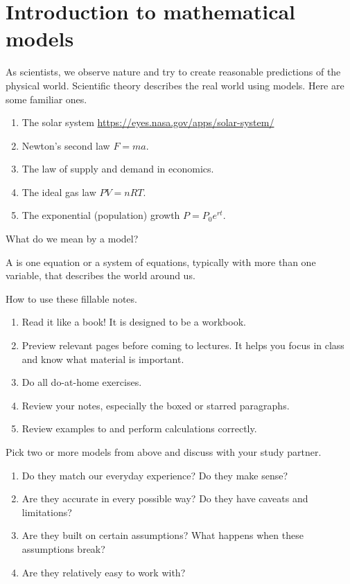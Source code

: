 \documentclass[../main.tex]{subfiles}
\begin{document}
 \section{Introduction to mathematical models}
As scientists, we observe nature and try to create reasonable predictions of the physical world. Scientific theory describes the real world using models. Here are some familiar ones.

\begin{enumerate}
  \item The solar system \url{https://eyes.nasa.gov/apps/solar-system/}
  \item Newton's second law \(F = ma\).
  \item The law of supply and demand in economics.
  \item The ideal gas law \(PV = nRT\).
  \item The exponential (population) growth \(P = P_{0} e^{rt}\).
\end{enumerate}

\bigskip

What do we mean by a model?
\begin{definition} \label{def:models}
  A  is one equation or a system of equations, typically with more than one variable, that describes the world around us.
\end{definition}


\faStar{} How to use these fillable notes.
\begin{enumerate}
  \item Read it like a book! It is designed to be a workbook.
  \item Preview relevant pages before coming to lectures. It helps you focus in class and know what material is important. 
  \item Do all do-at-home exercises.
  \item Review your notes, especially the boxed or starred paragraphs.
  \item Review examples to  and perform calculations correctly.
\end{enumerate}

\bigskip
\begin{exercise} \label{ex:models-discussion}
  Pick two or more models from above and discuss with your study partner.

  \begin{enumerate}
    \item Do they match our everyday experience? Do they make sense?

    \item Are they accurate in every possible way?  Do they have caveats and limitations?

    \item Are they built on certain assumptions? What happens when these assumptions break?

    \item Are they relatively easy to work with? 

  \end{enumerate}
\end{exercise}
\end{document}
